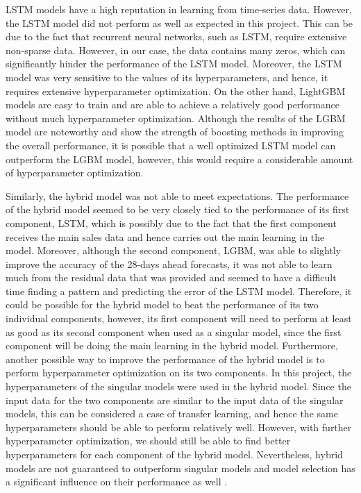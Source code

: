 LSTM models have a high reputation in learning from time-series data. 
However, the LSTM model did not perform as well as expected in this project.
This can be due to the fact that recurrent neural networks, such as LSTM, require extensive non-sparse data.
However, in our case, the data contains many zeros, which can significantly hinder the performance of the LSTM model.
Moreover, the LSTM model was very sensitive to the values of its hyperparameters, and hence, it requires extensive hyperparameter optimization.
On the other hand, LightGBM models are easy to train and are able to achieve a relatively good performance without much hyperparameter optimization.
Although the results of the LGBM model are noteworthy and show the strength of boosting methods in improving the overall performance, it is possible that a well optimized LSTM model can outperform the LGBM model, however, this would require a considerable amount of hyperparameter optimization.

Similarly, the hybrid model was not able to meet expectations. 
The performance of the hybrid model seemed to be very closely tied to the performance of its first component, LSTM, which is possibly due to the fact that the first component receives the main sales data and hence carries out the main learning in the model.
Moreover, although the second component, LGBM, was able to slightly improve the accuracy of the 28-days ahead forecasts, it was not able to learn much from the residual data that was provided and seemed to have a difficult time finding a pattern and predicting the error of the LSTM model.
Therefore, it could be possible for the hybrid model to beat the performance of its two individual components, however, its first component will need to perform at least as good as its second component when used as a singular model, since the first component will be doing the main learning in the hybrid model.
Furthermore, another possible way to improve the performance of the hybrid model is to perform hyperparameter optimization on its two components.
In this project, the hyperparameters of the singular models were used in the hybrid model.
Since the input data for the two components are similar to the input data of the singular models, this can be considered a case of transfer learning, and hence the same hyperparameters should be able to perform relatively well.
However, with further hyperparameter optimization, we should still be able to find better hyperparameters for each component of the hybrid model.
Nevertheless, hybrid models are not guaranteed to outperform singular models and model selection has a significant influence on their performance as well \cite{c12}.

